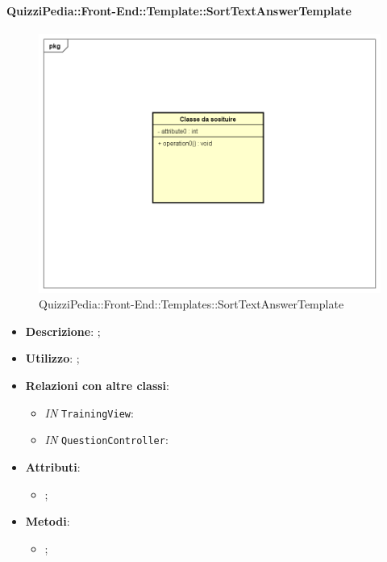 		\paragraph{QuizziPedia::Front-End::Template::SortTextAnswerTemplate}
		
				\label{QuizziPedia::Front-End::Templates::SortTextAnswerTemplate}

				\begin{figure}[h]
					\centering
					\includegraphics[scale=0.5,keepaspectratio]{UML/Classi/Front-End/Temporanea.png}
					\caption{QuizziPedia::Front-End::Templates::SortTextAnswerTemplate}
				\end{figure}
		
			\begin{itemize}
				\item \textbf{Descrizione}: ;
				\item \textbf{Utilizzo}: ;
				\item \textbf{Relazioni con altre classi}: 
				\begin{itemize}
						\item \textit{IN} \texttt{TrainingView}: 
						\item \textit{IN} \texttt{QuestionController}:
				\end{itemize}
				\item \textbf{Attributi}: 
				\begin{itemize}
					\item ;
				\end{itemize}
				\item \textbf{Metodi}: 
				\begin{itemize}
					\item ;
				\end{itemize}
			\end{itemize}
		
